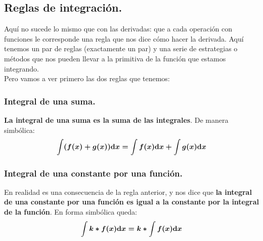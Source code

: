 \documentclass[a4paper,11pt,answers]{exam}
\begin{document}
\subsection{Reglas de integración.}
Aquí no sucede lo mismo que con las derivadas: que a cada operación con funciones le corresponde una regla que nos dice cómo hacer la derivada. Aquí tenemos un par de reglas (exactamente un par) y una serie de estrategias o métodos que nos pueden llevar a la primitiva de la función que estamos integrando.\\
Pero vamos a ver primero las dos reglas que tenemos:
\subsubsection{Integral de una suma.}
\textbf{La integral de una suma es la suma de las integrales}. De manera simbólica:
\[\boldsymbol{\int (f(x) + g(x)) \mathrm{d}x = \int f(x) \mathrm{d}x + \int g(x) \mathrm{d}x}\]
\subsubsection{Integral de una constante por una función.}
En realidad es una consecuencia de la regla anterior, y nos dice que \textbf{la integral de una constante por una función es igual a la constante por la integral de la función}. En forma simbólica queda:
\[\boldsymbol{\int k*f(x) \mathrm{d}x = k*\int f(x) \mathrm{d}x}\]
\end{document}
